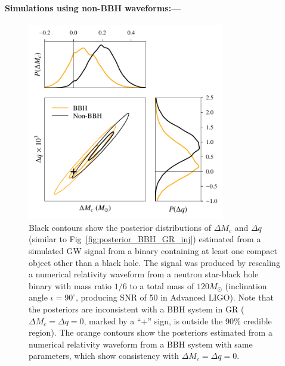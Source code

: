 \documentclass[prl,preprintnumbers,twocolumn,eqsecnum,floatfix,a4paper,nofootinbib,superscriptaddress]{revtex4}
\begin{document}
\paragraph{Simulations using non-BBH waveforms:---}

\begin{figure}[tbh] \begin{center}
\includegraphics[width=3.4in]{figs/posteriors_BBH_rescaled_NSBH.pdf}
\caption{Black contours show the posterior distributions of $\Delta M_c$ and $\Delta q$ (similar to Fig~\ref{fig:posterior_BBH_GR_inj}) estimated from a simulated GW signal from a binary containing at least one compact object other than a black hole. The signal was produced by rescaling a numerical relativity waveform from a neutron star-black hole binary with mass ratio $1/6$ to a total mass of $120 M_\odot$ (inclination angle $\iota = 90^\circ$, producing SNR of 50 in Advanced LIGO). Note that the posteriors are inconsistent with a BBH system in GR ($\Delta M_c = \Delta q = 0$, marked by a ``+'' sign, is outside the 90\% credible region). The orange contours show the posteriors estimated from a numerical relativity waveform from a BBH system with same parameters, which show consistency with $\Delta M_c = \Delta q = 0$.} 
\label{fig:posterior_nonBBH_inj}
\end{center} \end{figure}
\end{document}
